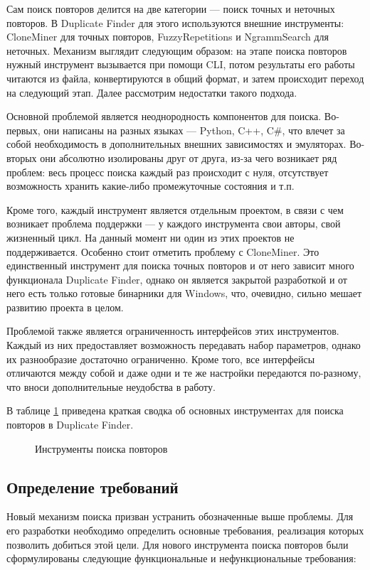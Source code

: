 \documentclass[14pt]{matmex-diploma-custom}
\begin{document}
Сам поиск повторов делится на две категории --- поиск точных и неточных повторов. В Duplicate Finder для этого используются внешние инструменты: CloneMiner \cite{bib:tool:CloneMiner} для точных повторов, FuzzyRepetitions \cite{bib:tool:FuzzySearch} и NgrammSearch \cite{bib:tool:ImprovedNgramSearch} для неточных. Механизм выглядит следующим образом: на этапе поиска повторов нужный инструмент вызывается при помощи CLI, потом результаты его работы читаются из файла, конвертируются в общий формат, и затем происходит переход на следующий этап. Далее рассмотрим недостатки такого подхода.

Основной проблемой является неоднородность компонентов для поиска. Во-первых, они написаны на разных языках --- Python, C++, C\#, что влечет за собой необходимость в дополнительных внешних зависимостях и эмуляторах. Во-вторых они абсолютно изолированы друг от друга, из-за чего возникает ряд проблем: весь процесс поиска каждый раз происходит с нуля, отсутствует возможность хранить какие-либо промежуточные состояния и т.п.

Кроме того, каждый инструмент является отдельным проектом, в связи с чем возникает проблема поддержки ---  у каждого инструмента свои авторы, свой жизненный цикл. На данный момент ни один из этих проектов не поддерживается. Особенно стоит отметить проблему с CloneMiner. Это единственный инструмент для поиска точных повторов и от него зависит много функционала Duplicate Finder, однако он является закрытой разработкой и от него есть только готовые бинарники для Windows, что, очевидно, сильно мешает развитию проекта в целом.

Проблемой также является ограниченность интерфейсов этих инструментов. Каждый из них предоставляет возможность передавать набор параметров, однако их разнообразие достаточно ограниченно. Кроме того, все интерфейсы отличаются между собой и даже одни и те же настройки передаются по-разному, что вноси дополнительные неудобства в работу.


В таблице \ref{table:SearchTools} приведена краткая сводка об основных инструментах для поиска повторов в Duplicate Finder.

\begin{figure}[h!]
	\centering
	
	\caption{Инструменты поиска повторов}
	\label{table:SearchTools}
\end{figure}

\subsection{Определение требований}
Новый механизм поиска призван устранить обозначенные выше проблемы. Для его разработки необходимо определить основные требования, реализация которых позволить добиться этой цели. Для нового инструмента поиска повторов были сформулированы следующие функциональные и нефункциональные требования:
\end{document}
